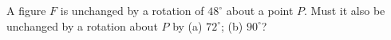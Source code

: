 A figure $F$ is unchanged by a rotation of $48^\circ$ about a point $P$. Must it also be unchanged by a rotation about $P$ by (a) $72^\circ$; (b) $90^\circ$?
